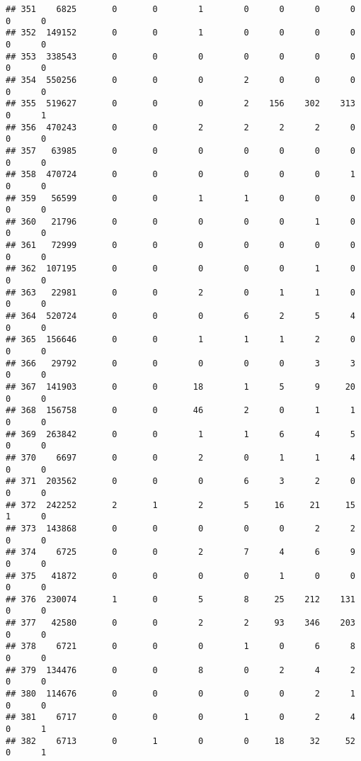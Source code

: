 \documentclass[
]{article}
\begin{document}
\begin{verbatim}
## 351    6825       0       0        1        0      0      0      0     0      0
## 352  149152       0       0        1        0      0      0      0     0      0
## 353  338543       0       0        0        0      0      0      0     0      0
## 354  550256       0       0        0        2      0      0      0     0      0
## 355  519627       0       0        0        2    156    302    313     0      1
## 356  470243       0       0        2        2      2      2      0     0      0
## 357   63985       0       0        0        0      0      0      0     0      0
## 358  470724       0       0        0        0      0      0      1     0      0
## 359   56599       0       0        1        1      0      0      0     0      0
## 360   21796       0       0        0        0      0      1      0     0      0
## 361   72999       0       0        0        0      0      0      0     0      0
## 362  107195       0       0        0        0      0      1      0     0      0
## 363   22981       0       0        2        0      1      1      0     0      0
## 364  520724       0       0        0        6      2      5      4     0      0
## 365  156646       0       0        1        1      1      2      0     0      0
## 366   29792       0       0        0        0      0      3      3     0      0
## 367  141903       0       0       18        1      5      9     20     0      0
## 368  156758       0       0       46        2      0      1      1     0      0
## 369  263842       0       0        1        1      6      4      5     0      0
## 370    6697       0       0        2        0      1      1      4     0      0
## 371  203562       0       0        0        6      3      2      0     0      0
## 372  242252       2       1        2        5     16     21     15     1      0
## 373  143868       0       0        0        0      0      2      2     0      0
## 374    6725       0       0        2        7      4      6      9     0      0
## 375   41872       0       0        0        0      1      0      0     0      0
## 376  230074       1       0        5        8     25    212    131     0      0
## 377   42580       0       0        2        2     93    346    203     0      0
## 378    6721       0       0        0        1      0      6      8     0      0
## 379  134476       0       0        8        0      2      4      2     0      0
## 380  114676       0       0        0        0      0      2      1     0      0
## 381    6717       0       0        0        1      0      2      4     0      1
## 382    6713       0       1        0        0     18     32     52     0      1

\end{verbatim}
\end{document}
